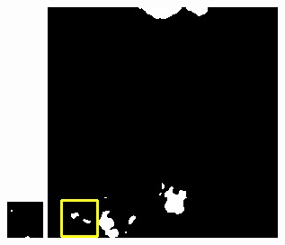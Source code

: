 \documentclass[10pt,UTF8,fntef]{ctexart}
\begin{document}
\begin{multicols}{2}
\begin{figure}[H]
{\begin{minipage}[b]{0.15\linewidth}
            \includegraphics[width=1\linewidth]{../log/spoon4/cut/tmp_cut_LC80980712014024LGN00_15440_unet.jpg}\vspace{4pt}
            \includegraphics[width=1\linewidth]{../log/spoon4/cut/LC81390292014135LGN00_14081_unet.jpg}\vspace{4pt}

\end{minipage}}
\end{figure}
\end{multicols}
\end{document}
